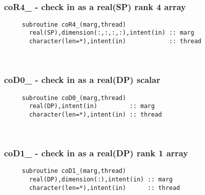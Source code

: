  
\mbox{}\hrulefill\ 
 
  \subsubsection{coR4\_ - check in as a real(SP) rank 4 array}

\begin{verbatim} 
     subroutine coR4_(marg,thread)
       real(SP),dimension(:,:,:,:),intent(in) :: marg
       character(len=*),intent(in)            :: thread
 \end{verbatim}%
 
 
\mbox{}\hrulefill\ 
 
  \subsubsection{coD0\_ - check in as a real(DP) scalar}

\begin{verbatim} 
     subroutine coD0_(marg,thread)
       real(DP),intent(in)         :: marg
       character(len=*),intent(in) :: thread
 \end{verbatim}%
 
 
\mbox{}\hrulefill\ 
 
  \subsubsection{coD1\_ - check in as a real(DP) rank 1 array}

\begin{verbatim} 
     subroutine coD1_(marg,thread)
       real(DP),dimension(:),intent(in) :: marg
       character(len=*),intent(in)      :: thread
 \end{verbatim}%
 
